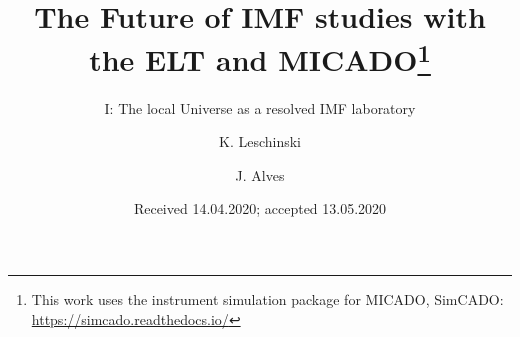 \documentclass[referee]{aa}
\begin{document}
  \title{The Future of IMF studies with the ELT and MICADO\thanks{This work uses the instrument simulation package for MICADO, SimCADO: \url{https://simcado.readthedocs.io/}}}
  \subtitle{I: The local Universe as a resolved IMF laboratory}
  \author{K. Leschinski
     \and
          J. Alves
     }


  \date{Received 14.04.2020; accepted 13.05.2020}

\end{document}
